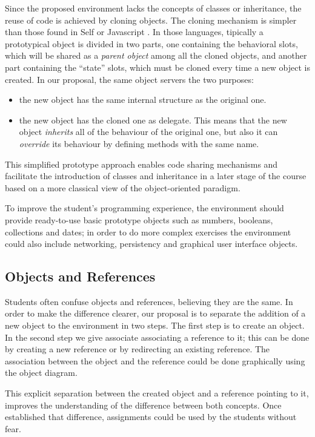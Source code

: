 \documentclass{sigplanconf}
\begin{document}
Since the proposed environment lacks the concepts of classes or inheritance, the
reuse of code is achieved by cloning objects. The cloning mechanism is simpler
than those found in Self \cite{Unga07} or Javascript \cite{Wilk02}. In those languages, tipically a
prototypical object is divided in two parts, one containing the behavioral
slots, which will be shared as a \textit{parent object} among all the cloned
objects, and another part containing the ``state'' slots, which must be cloned every time a new object is created. In our proposal, the same object servers the two purposes: 
\begin{itemize}
\item the new object has the same internal structure as the original one. 
\item the new object has the cloned one as delegate. This means that the new
object \textit{inherits} all of the behaviour of the original one, but also it can \textit{override} its behaviour by defining methods with the same name.
\end{itemize}	
This simplified prototype approach enables code sharing mechanisms and facilitate the introduction of classes and inheritance in a later stage of the course based on a more classical view of the object-oriented paradigm.

To improve the student’s programming experience, the environment should provide ready-to-use basic prototype objects such as numbers, booleans, collections and dates; in order to do more complex exercises the environment could also include networking, persistency and graphical user interface objects.

\subsection{Objects and References}
Students often confuse objects and references, believing they are the same. In order to make the difference clearer, our proposal is to separate the addition of a new object to the environment in two steps. The first step is to create an object.  In the second step we give associate associating a reference to it; this can be done by creating a new reference or by redirecting an existing reference.  The association between the object and the reference could be done graphically using the object diagram. 

This explicit separation between the created object and a reference pointing to it, improves the understanding of the difference between both concepts. Once established that difference, assignments could be used by the students without fear.
\end{document}
